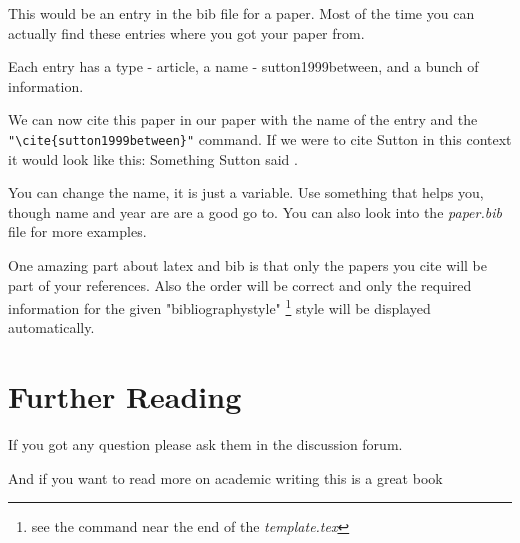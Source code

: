 This would be an entry in the bib file for a paper. Most of the time you can actually find these entries where you got your paper from. 

Each entry has a type - article, a name - sutton1999between, and a bunch of information.

We can now cite this paper in our paper with the name of the entry and the \verb!"\cite{sutton1999between}"! command. If we were to cite Sutton in this context it would look like this: Something Sutton said \cite{sutton1999between}. 

You can change the name, it is just a variable. Use something that helps you, though name and year are are a good go to. You can also look into the \textit{paper.bib} file for more examples.


One amazing part about latex and bib is that only the papers you cite will be part of your references. Also the order will be correct and only the required information for the given "bibliographystyle" \footnote{see the command near the end of the \textit{template.tex}} style will be displayed automatically.

\section{Further Reading}
If you got any question please ask them in the discussion forum.

And if you want to read more on academic writing this is a great book\cite{zobel}